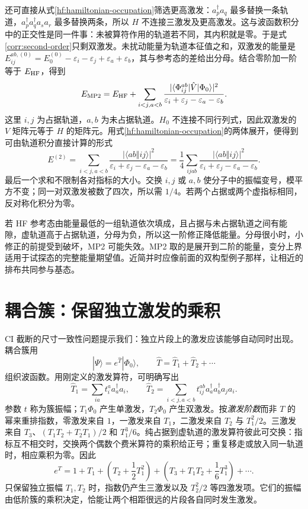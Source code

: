 还可直接从式\eqref{hf:hamiltonian-occupation}筛选更高激发：$a_p^\dagger a_q$ 最多替换一条轨道，$a_p^\dagger a_q^\dagger a_s a_r$ 最多替换两条，所以 $H$ 不连接三激发及更高激发。这与波函数积分中的正交性是同一件事：未被算符作用的轨道若不同，其内积就是零。于是式\eqref{corr:second-order}只剩双激发。未扰动能量为轨道本征值之和，双激发的能量是 $E_{ij}^{ab,(0)}=E_0^{(0)}-\varepsilon_i-\varepsilon_j+\varepsilon_a+\varepsilon_b$，其与参考态的差给出分母。结合零阶加一阶等于 $E_{\rm HF}$，得到
\begin{equation}
E_{\rm MP2}=E_{\rm HF}+\sum_{i<j,a<b}
\frac{|\langle\Phi_{ij}^{ab}|\hat V|\Phi_0\rangle|^2}
{\varepsilon_i+\varepsilon_j-\varepsilon_a-\varepsilon_b}.
\end{equation}
这里 $i,j$ 为占据轨道，$a,b$ 为未占据轨道。$H_0$ 不连接不同行列式，因此双激发的 $V$ 矩阵元等于 $H$ 的矩阵元。用式\eqref{hf:hamiltonian-occupation}的两体展开，便得到可由轨道积分直接计算的形式
\begin{equation}\label{corr:mp2-integrals}
E^{(2)}=\sum_{i<j,a<b}\frac{|\langle ab\Vert ij\rangle|^2}
{\varepsilon_i+\varepsilon_j-\varepsilon_a-\varepsilon_b}
=\frac14\sum_{ijab}\frac{|\langle ab\Vert ij\rangle|^2}
{\varepsilon_i+\varepsilon_j-\varepsilon_a-\varepsilon_b}.
\end{equation}
最后一个求和不限制各对指标的大小。交换 $i,j$ 或 $a,b$ 使分子中的振幅变号，模平方不变；同一对双激发被数了四次，所以需 $1/4$。若两个占据或两个虚指标相同，反对称化积分为零。

若 HF 参考态由能量最低的一组轨道依次填成，且占据与未占据轨道之间有能隙，虚轨道高于占据轨道，分母为负，所以这一阶修正降低能量。分母很小时，小修正的前提受到破坏，MP2 可能失效。MP2 取的是展开到二阶的能量，变分上界适用于试探态的完整能量期望值。近简并时应像前面的双构型例子那样，让相近的排布共同参与基态。

\section{耦合簇：保留独立激发的乘积}
CI 截断的尺寸一致性问题提示我们：独立片段上的激发应该能够自动同时出现。耦合簇用
\begin{equation}
|\Psi\rangle=e^{\hat T}|\Phi_0\rangle,\qquad \hat T=\hat T_1+\hat T_2+\cdots
\end{equation}
组织波函数。用刚定义的激发算符，可明确写出
\begin{equation}
\hat T_1=\sum_{ia}t_i^a a_a^\dagger a_i,\qquad
\hat T_2=\sum_{i<j,a<b}t_{ij}^{ab}a_a^\dagger a_b^\dagger a_j a_i.
\end{equation}
参数 $t$ 称为簇振幅；$T_1\Phi_0$ 产生单激发，$T_2\Phi_0$ 产生双激发。按\emph{激发阶数}而非 $T$ 的幂来重排指数，零激发来自 $1$，一激发来自 $T_1$，二激发来自 $T_2$ 与 $T_1^2/2$。三激发来自 $T_3$、$(T_1T_2+T_2T_1)/2$ 和 $T_1^3/6$。纯占据到虚轨道的激发算符彼此可交换：指标互不相交时，交换两个偶数个费米算符的乘积给正号；重复移走或放入同一轨道时，相应乘积为零。因此
\begin{equation}
e^T=1+T_1+\left(T_2+\frac12T_1^2\right)
+\left(T_3+T_1T_2+\frac16T_1^3\right)+\cdots.
\end{equation}
只保留独立振幅 $T_1,T_2$ 时，指数仍产生三激发以及 $T_2^2/2$ 等四激发项。它们的振幅由低阶簇的乘积决定，恰能让两个相距很远的片段各自同时发生激发。

